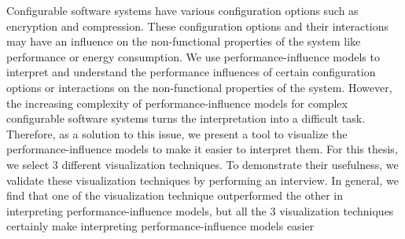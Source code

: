 
Configurable software systems have various configuration options such as encryption and compression. These configuration options and their interactions may have an influence on the non-functional properties of the system like performance or energy consumption. We use performance-influence models to interpret and understand the performance influences of certain configuration options or interactions on the non-functional properties of the system. However, the increasing complexity of performance-influence models for complex configurable software systems turns the interpretation into a difficult task. Therefore, as a solution to this issue, we present a tool to visualize the performance-influence models to make it easier to interpret them. For this thesis, we select 3 different visualization techniques. To demonstrate their usefulness, we validate these visualization techniques by performing an interview. In general, we find that one of the visualization technique outperformed the other in interpreting performance-influence models, but all the 3 visualization techniques certainly make interpreting performance-influence models easier